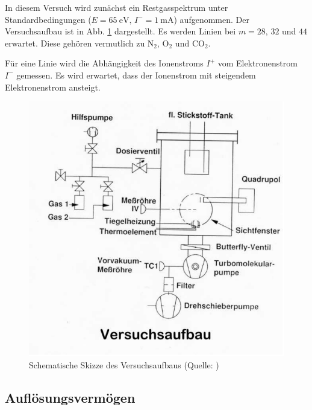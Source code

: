 In diesem Versuch wird zunächst ein Restgasspektrum unter Standardbedingungen ($E=\SI{65}{\electronvolt}, \, I^{-}=\SI{1}{\milli\ampere}$) aufgenommen. Der Versuchsaufbau ist in Abb. \ref{fig0v11} dargestellt.
Es werden Linien bei $m=28,\, 32$ und $44$ erwartet. Diese gehören vermutlich zu $\textrm{N}_{2}, \, \textrm{O}_{2}$ und $\textrm{CO}_{2}$.

Für eine Linie wird die Abhängigkeit des Ionenstroms $I^{+}$ vom Elektronenstrom $I^{-}$ gemessen. Es wird erwartet, dass der Ionenstrom mit steigendem Elektronenstrom ansteigt.

\begin{figure}[tb]
 \centering
 \includegraphics[scale=0.5]{./fig/massenspek_aufbau.png}
 \caption{Schematische Skizze des Versuchsaufbaus (Quelle: \cite[S. 4]{Litmap})}
 \label{fig0v11}
\end{figure}

\subsection{Auflösungsvermögen}

